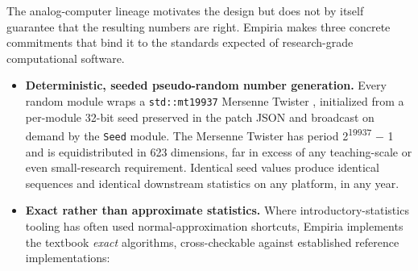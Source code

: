 The analog-computer lineage motivates the design but does not by itself
guarantee that the resulting numbers are right. Empiria makes three
concrete commitments that bind it to the standards expected of
research-grade computational software.

\begin{itemize}
\item
  \textbf{Deterministic, seeded pseudo-random number generation.} Every
  random module wraps a \texttt{std::mt19937} Mersenne Twister
  \citep{matsumoto1998}, initialized from a per-module 32-bit seed
  preserved in the patch JSON and broadcast on demand by the
  \texttt{Seed} module. The Mersenne Twister has period 2\textsuperscript{1}\textsuperscript{9}\textsuperscript{9}\textsuperscript{3}\textsuperscript{7} $-$ 1 and
  is equidistributed in 623 dimensions, far in excess of any
  teaching-scale or even small-research requirement. Identical seed
  values produce identical sequences and identical downstream statistics
  on any platform, in any year.
\item
  \textbf{Exact rather than approximate statistics.} Where
  introductory-statistics tooling has often used normal-approximation
  shortcuts, Empiria implements the textbook \emph{exact} algorithms,
  cross-checkable against established reference implementations:


\end{itemize}
